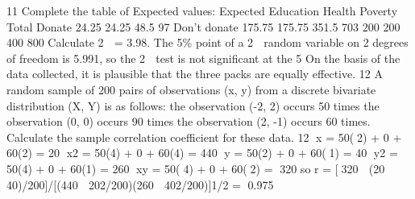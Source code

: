 \documentclass[a4paper,12pt]{article}
\begin{document}
11 Complete the table of Expected values:
Expected Education Health Poverty Total
Donate 24.25 24.25 48.5 97
Don’t donate 175.75 175.75 351.5 703
200 200 400 800
Calculate 2
 = 3.98.
The 5\% point of a 2
 random variable on 2 degrees of freedom is 5.991,
so the 2
 test is not significant at the 5%
On the basis of the data collected, it is plausible that the three packs are equally
effective.
\newpage
12 A random sample of 200 pairs of observations (x, y) from a discrete bivariate
distribution (X, Y) is as follows:
the observation (-2, 2) occurs 50 times
the observation (0, 0) occurs 90 times
the observation (2, -1) occurs 60 times.
Calculate the sample correlation coefficient for these data.
12 x = 50(2) + 0 + 60(2) = 20 x2 = 50(4) + 0 + 60(4) = 440
y = 50(2) + 0 + 60(1) = 40 y2 = 50(4) + 0 + 60(1) = 260
xy = 50(4) + 0 + 60(2) = 320
so r = [320  (20  40)/200]/[(440  202/200)(260  402/200)]1/2 = 0.975
\end{document}
